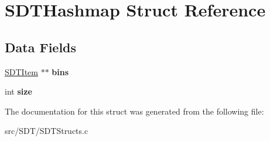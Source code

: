 \hypertarget{struct_s_d_t_hashmap}{}\section{S\+D\+T\+Hashmap Struct Reference}
\label{struct_s_d_t_hashmap}
\subsection*{Data Fields}
\begin{DoxyCompactItemize}
\item 
\hypertarget{struct_s_d_t_hashmap_aa770171a17871b0df6407e0b73224759}{}\hyperlink{struct_s_d_t_item}{S\+D\+T\+Item} $\ast$$\ast$ {\bfseries bins}\label{struct_s_d_t_hashmap_aa770171a17871b0df6407e0b73224759}

\item 
\hypertarget{struct_s_d_t_hashmap_a439227feff9d7f55384e8780cfc2eb82}{}int {\bfseries size}\label{struct_s_d_t_hashmap_a439227feff9d7f55384e8780cfc2eb82}

\end{DoxyCompactItemize}


The documentation for this struct was generated from the following file\+:\begin{DoxyCompactItemize}
\item 
src/\+S\+D\+T/S\+D\+T\+Structs.\+c\end{DoxyCompactItemize}
